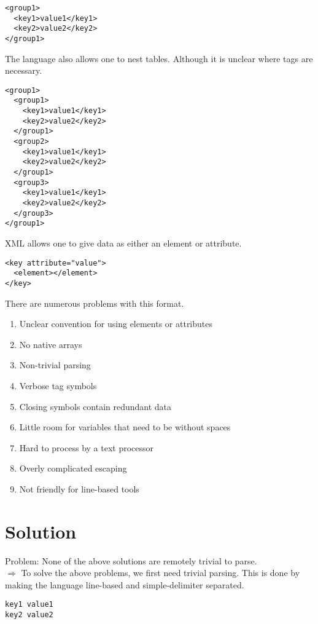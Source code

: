 \documentclass[listof=totoc]{article}
\begin{document}
\begin{verbatim}
<group1>
  <key1>value1</key1>
  <key2>value2</key2>
</group1>
\end{verbatim}

\noindent The language also allows one to nest tables. Although it is unclear where tags are necessary.

\begin{verbatim}
<group1>
  <group1>
    <key1>value1</key1>
    <key2>value2</key2>
  </group1>
  <group2>
    <key1>value1</key1>
    <key2>value2</key2>
  </group1>
  <group3>
    <key1>value1</key1>
    <key2>value2</key2>
  </group3>
</group1>
\end{verbatim}

\noindent XML allows one to give data as either an element or attribute.

\begin{verbatim}
<key attribute="value">
  <element></element>
</key>
\end{verbatim}

\noindent There are numerous problems with this format.

\begin{enumerate}
  \item Unclear convention for using elements or attributes
  \item No native arrays
  \item Non-trivial parsing
  \item Verbose tag symbols
  \item Closing symbols contain redundant data
  \item Little room for variables that need to be without spaces
  \item Hard to process by a text processor
  \item Overly complicated escaping
  \item Not friendly for line-based tools
\end{enumerate}

\section{Solution}
\noindent Problem: None of the above solutions are remotely trivial to parse. \\
$\Rightarrow$ To solve the above problems, we first need trivial parsing. This is done by making the language line-based and simple-delimiter separated.

\begin{verbatim}
key1 value1
key2 value2
\end{verbatim}
\end{document}
